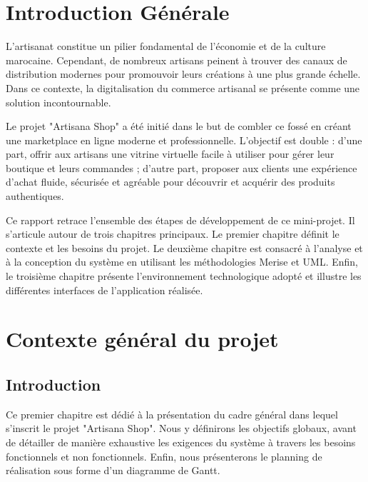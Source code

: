 \documentclass[12pt,a4paper]{report}
\begin{document}
\tableofcontents

\clearpage
{}

\chapter*{Introduction Générale}
L'artisanat constitue un pilier fondamental de l'économie et de la culture marocaine. Cependant, de nombreux artisans peinent à trouver des canaux de distribution modernes pour promouvoir leurs créations à une plus grande échelle. Dans ce contexte, la digitalisation du commerce artisanal se présente comme une solution incontournable.

Le projet "Artisana Shop" a été initié dans le but de combler ce fossé en créant une marketplace en ligne moderne et professionnelle. L'objectif est double : d'une part, offrir aux artisans une vitrine virtuelle facile à utiliser pour gérer leur boutique et leurs commandes ; d'autre part, proposer aux clients une expérience d'achat fluide, sécurisée et agréable pour découvrir et acquérir des produits authentiques.

Ce rapport retrace l'ensemble des étapes de développement de ce mini-projet. Il s'articule autour de trois chapitres principaux. Le premier chapitre définit le contexte et les besoins du projet. Le deuxième chapitre est consacré à l'analyse et à la conception du système en utilisant les méthodologies Merise et UML. Enfin, le troisième chapitre présente l'environnement technologique adopté et illustre les différentes interfaces de l'application réalisée.

\chapter{Contexte général du projet}

\section{Introduction}
Ce premier chapitre est dédié à la présentation du cadre général dans lequel s'inscrit le projet "Artisana Shop". Nous y définirons les objectifs globaux, avant de détailler de manière exhaustive les exigences du système à travers les besoins fonctionnels et non fonctionnels. Enfin, nous présenterons le planning de réalisation sous forme d'un diagramme de Gantt.
\end{document}
